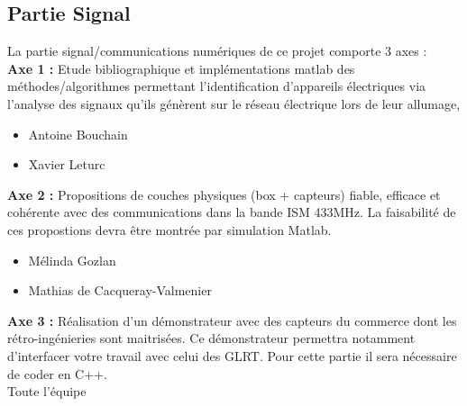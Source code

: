 \documentclass[10pt,a4paper]{article}
\begin{document}
\subsection{Partie Signal}
La partie signal/communications numériques de ce projet comporte 3 axes :\\
\textbf{Axe 1 :} Etude bibliographique et implémentations matlab des méthodes/algorithmes permettant l’identification
d’appareils électriques via l’analyse des signaux qu’ils génèrent sur le réseau électrique lors de leur allumage,
\begin{itemize}
\item Antoine Bouchain
\item Xavier Leturc
\end{itemize}
\textbf{Axe 2 :} Propositions de couches physiques (box + capteurs) fiable, efficace et cohérente avec des communications
dans la bande ISM 433MHz. La faisabilité de ces propostions devra être montrée par simulation Matlab.
\begin{itemize}
\item Mélinda Gozlan
\item Mathias de Cacqueray-Valmenier
\end{itemize}
\textbf{Axe 3 :} Réalisation d’un démonstrateur avec des capteurs du commerce dont les rétro-ingénieries sont maitrisées.
Ce démonstrateur permettra notamment d’interfacer votre travail avec celui des GLRT. Pour cette partie il sera
nécessaire de coder en C++. \\
Toute l'équipe
\newpage
\end{document}
